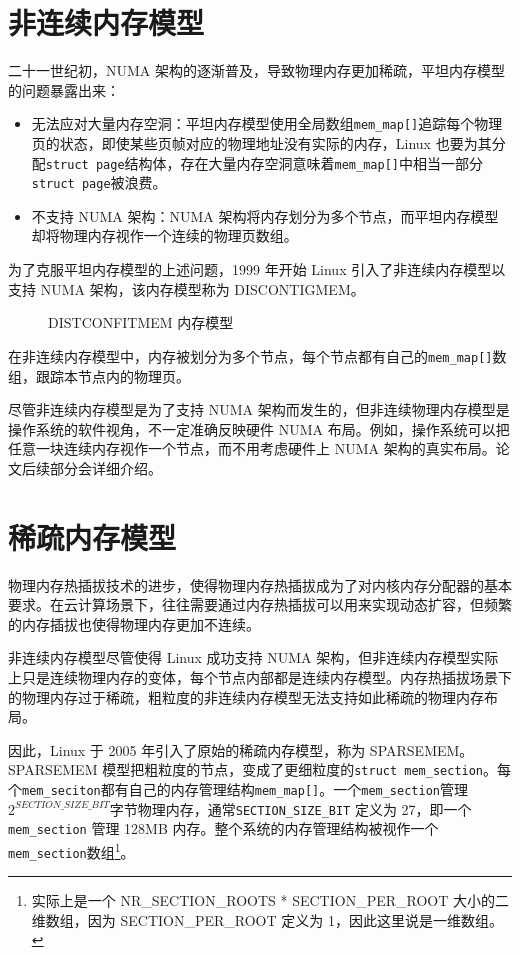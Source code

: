 \documentclass[AutoFakeBold]{LZUThesis}
\begin{document}
\begin{sloppypar}
\section{非连续内存模型}

二十一世纪初，NUMA
架构的逐渐普及，导致物理内存更加稀疏，平坦内存模型的问题暴露出来：

\begin{itemize}
\item
  无法应对大量内存空洞：平坦内存模型使用全局数组\texttt{mem\_map{[}{]}}追踪每个物理页的状态，即使某些页帧对应的物理地址没有实际的内存，Linux
  也要为其分配\texttt{struct\ page}结构体，存在大量内存空洞意味着\texttt{mem\_map{[}{]}}中相当一部分\texttt{struct\ page}被浪费。
\item
  不支持 NUMA 架构：NUMA
  架构将内存划分为多个节点，而平坦内存模型却将物理内存视作一个连续的物理页数组。
\end{itemize}

为了克服平坦内存模型的上述问题，1999 年开始 Linux
引入了非连续内存模型以支持 NUMA 架构，该内存模型称为 DISCONTIGMEM。


\begin{figure}[H]
\centering

\caption{DISTCONFITMEM 内存模型}
\end{figure}

在非连续内存模型中，内存被划分为多个节点，每个节点都有自己的\texttt{mem\_map{[}{]}}数组，跟踪本节点内的物理页。

尽管非连续内存模型是为了支持 NUMA
架构而发生的，但非连续物理内存模型是操作系统的软件视角，不一定准确反映硬件
NUMA
布局。例如，操作系统可以把任意一块连续内存视作一个节点，而不用考虑硬件上
NUMA 架构的真实布局。论文后续部分会详细介绍。


\section{稀疏内存模型}

物理内存热插拔技术的进步，使得物理内存热插拔成为了对内核内存分配器的基本要求。在云计算场景下，往往需要通过内存热插拔可以用来实现动态扩容，但频繁的内存插拔也使得物理内存更加不连续。

非连续内存模型尽管使得 Linux 成功支持 NUMA 架构，但非连续内存模型实际上只是连续物理内存的变体，每个节点内部都是连续内存模型。内存热插拔场景下的物理内存过于稀疏，粗粒度的非连续内存模型无法支持如此稀疏的物理内存布局。

因此，Linux 于 2005 年引入了原始的稀疏内存模型，称为 SPARSEMEM。SPARSEMEM 模型把粗粒度的节点，变成了更细粒度的\texttt{struct\ mem\_section}。每个\texttt{mem\_seciton}都有自己的内存管理结构\texttt{mem\_map{[}{]}}。一个\texttt{mem\_section}管理\(2^{SECTION\_SIZE\_BIT}\)字节物理内存，通常\texttt{SECTION\_SIZE\_BIT}
定义为 27，即一个\texttt{mem\_section} 管理 128MB
内存。整个系统的内存管理结构被视作一个\texttt{mem\_section}数组\footnote{实际上是一个 NR\_SECTION\_ROOTS * SECTION\_PER\_ROOT 大小的二维数组，因为 SECTION\_PER\_ROOT 定义为 1，因此这里说是一维数组。}。


\end{sloppypar}
\end{document}
